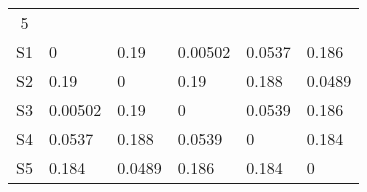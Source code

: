 \begin{tabular}{clllll}
  5\\
  S1 & 0 & 0.19 & 0.00502 & 0.0537 & 0.186\\
  S2 & 0.19 & 0 & 0.19 & 0.188 & 0.0489\\
  S3 & 0.00502 & 0.19 & 0 & 0.0539 & 0.186\\
  S4 & 0.0537 & 0.188 & 0.0539 & 0 & 0.184\\
  S5 & 0.184 & 0.0489 & 0.186 & 0.184 & 0\\
\end{tabular}

